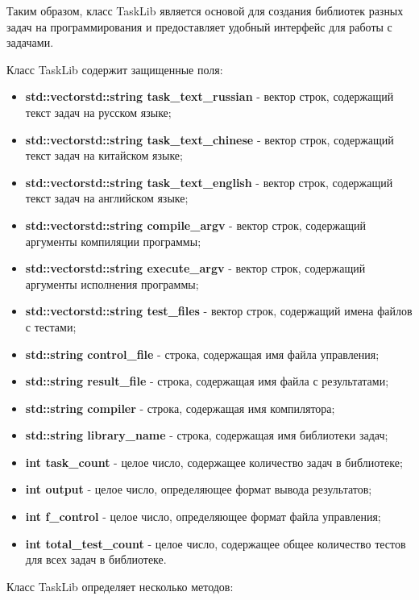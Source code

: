 Таким образом, класс TaskLib является основой для создания библиотек разных 
задач на программирования и предоставляет удобный интерфейс для работы с задачами.

Класс TaskLib содержит защищенные поля:

\begin{itemize}
\item \textbf{std::vectorstd::string task\_text\_russian} - вектор строк, содержащий текст задач на русском языке;
\item \textbf{std::vectorstd::string task\_text\_chinese} - вектор строк, содержащий текст задач на китайском языке;
\item \textbf{std::vectorstd::string task\_text\_english} - вектор строк, содержащий текст задач на английском языке;
\item \textbf{std::vectorstd::string compile\_argv} - вектор строк, содержащий аргументы компиляции программы;
\item \textbf{std::vectorstd::string execute\_argv} - вектор строк, содержащий аргументы исполнения программы;
\item \textbf{std::vectorstd::string test\_files} - вектор строк, содержащий имена файлов с тестами;
\item \textbf{std::string control\_file} - строка, содержащая имя файла управления;
\item \textbf{std::string result\_file} - строка, содержащая имя файла с результатами;
\item \textbf{std::string compiler} - строка, содержащая имя компилятора;
\item \textbf{std::string library\_name} - строка, содержащая имя библиотеки задач;
\item \textbf{int task\_count} - целое число, содержащее количество задач в библиотеке;
\item \textbf{int output} - целое число, определяющее формат вывода результатов;
\item \textbf{int f\_control} - целое число, определяющее формат файла управления;
\item \textbf{int total\_test\_count} - целое число, содержащее общее количество тестов для всех задач в библиотеке.
\end{itemize}

Класс TaskLib определяет несколько методов:

